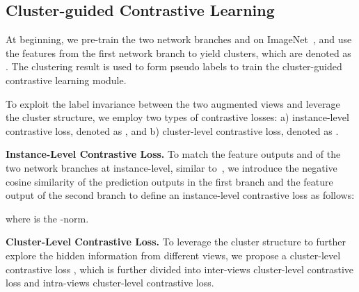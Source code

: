 \documentclass[journal]{IEEEtran}
\newcommand{\myparagraph}[1]{\noindent\textbf{#1.}}
\begin{document}
\subsection{Cluster-guided Contrastive Learning}

At beginning, we pre-train the two network branches  and  on ImageNet~\cite{Krizhevsky:NIPS12}, and use the features from the first network branch  to yield 
clusters, which are denoted as .  The clustering result is used to form pseudo labels to train the cluster-guided contrastive learning module.


To exploit the label invariance between the two augmented views and leverage the cluster structure, we employ two types of contrastive losses: a) instance-level contrastive loss, denoted as , and b) cluster-level contrastive loss, denoted as . 

\myparagraph{Instance-Level Contrastive Loss} 
To match the feature outputs  and  of the two network branches at instance-level, similar to~\cite{Chen:ICLR20, Larochelle:NIPS2020}, we introduce the negative cosine similarity of the prediction outputs  in the first branch and the feature output of the second branch  to define an instance-level contrastive loss  as follows:

where  is the -norm. 



\myparagraph{Cluster-Level Contrastive Loss} 
To leverage the cluster structure to further explore the hidden information from different views, we propose a cluster-level contrastive loss , which is further divided into inter-views cluster-level contrastive loss and intra-views cluster-level contrastive loss. 
\end{document}
